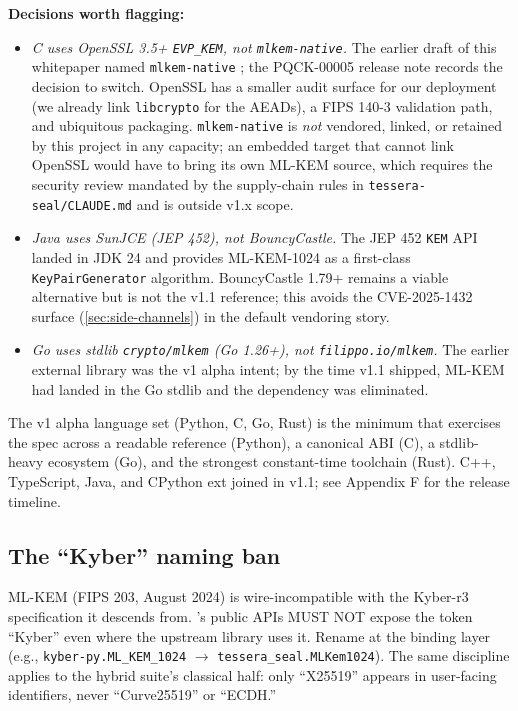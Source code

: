 \textbf{Decisions worth flagging:}
\begin{itemize}
\item \emph{C uses OpenSSL 3.5+ \texttt{EVP\_KEM}, not \texttt{mlkem-native}.} The earlier draft of this whitepaper named \texttt{mlkem-native} \citep{cryspen2025mlkem}; the PQCK-00005 release note records the decision to switch. OpenSSL has a smaller audit surface for our deployment (we already link \texttt{libcrypto} for the AEADs), a FIPS 140-3 validation path, and ubiquitous packaging. \texttt{mlkem-native} is \emph{not} vendored, linked, or retained by this project in any capacity; an embedded target that cannot link OpenSSL would have to bring its own ML-KEM source, which requires the security review mandated by the supply-chain rules in \texttt{tessera-seal/CLAUDE.md} and is outside v1.x scope.
\item \emph{Java uses SunJCE (JEP 452), not BouncyCastle.} The JEP 452 \texttt{KEM} API landed in JDK 24 and provides ML-KEM-1024 as a first-class \texttt{KeyPairGenerator} algorithm. BouncyCastle 1.79+ remains a viable alternative but is not the v1.1 reference; this avoids the CVE-2025-1432 surface (\cref{sec:side-channels}) in the default vendoring story.
\item \emph{Go uses stdlib \texttt{crypto/mlkem} (Go 1.26+), not \texttt{filippo.io/mlkem}.} The earlier external library was the v1 alpha intent; by the time v1.1 shipped, ML-KEM had landed in the Go stdlib and the dependency was eliminated.
\end{itemize}

The v1 alpha language set (Python, C, Go, Rust) is the minimum that exercises the spec across a readable reference (Python), a canonical ABI (C), a stdlib-heavy ecosystem (Go), and the strongest constant-time toolchain (Rust). C++, TypeScript, Java, and CPython ext joined in v1.1; see Appendix F for the release timeline.

\subsection{The ``Kyber'' naming ban}

ML-KEM (FIPS 203, August 2024) is wire-incompatible with the Kyber-r3 specification it descends from. \pqcrypt{}'s public APIs MUST NOT expose the token ``Kyber'' even where the upstream library uses it. Rename at the binding layer (e.g., \texttt{kyber-py.ML\_KEM\_1024} $\to$ \texttt{tessera\_seal.MLKem1024}). The same discipline applies to the hybrid suite's classical half: only ``X25519'' appears in user-facing identifiers, never ``Curve25519'' or ``ECDH.''
